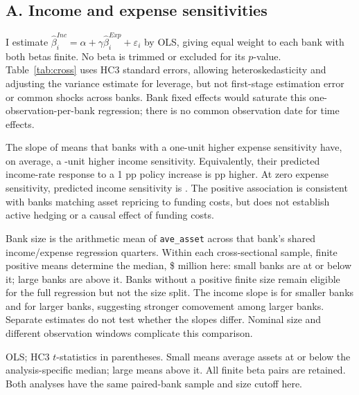 \documentclass[10pt]{article}
\begin{document}
\subsection*{A. Income and expense sensitivities}
I estimate $\widehat\beta_i^{Inc}=\alpha+\gamma\widehat\beta_i^{Exp}+\varepsilon_i$ by OLS, giving equal weight to each bank with both betas finite. No beta is trimmed or excluded for its $p$-value. Table~\ref{tab:cross} uses HC3 standard errors, allowing heteroskedasticity and adjusting the variance estimate for leverage, but not first-stage estimation error or common shocks across banks. Bank fixed effects would saturate this one-observation-per-bank regression; there is no common observation date for time effects.

The slope of \IncAllSlope{} means that banks with a one-unit higher expense sensitivity have, on average, a \IncAllSlope{}-unit higher income sensitivity. Equivalently, their predicted income-rate response to a 1 pp policy increase is \IncAllSlope{} pp higher. At zero expense sensitivity, predicted income sensitivity is \IncAllIntercept{}. The positive association is consistent with banks matching asset repricing to funding costs, but does not establish active hedging or a causal effect of funding costs.

Bank size is the arithmetic mean of \texttt{ave\_asset} across that bank's shared income/expense regression quarters. Within each cross-sectional sample, finite positive means determine the median, \$\SizeCutoff{} million here: small banks are at or below it; large banks are above it. Banks without a positive finite size remain eligible for the full regression but not the size split. The income slope is \IncSmallSlope{} for smaller banks and \IncLargeSlope{} for larger banks, suggesting stronger comovement among larger banks. Separate estimates do not test whether the slopes differ. Nominal size and different observation windows complicate this comparison.

\begin{table}[H]
\centering
\caption{Cross-sectional relationships between bank sensitivities}\label{tab:cross}

\begin{minipage}{0.97\textwidth}\footnotesize
OLS; HC3 $t$-statistics in parentheses. Small means average assets at or below the analysis-specific median; large means above it. All finite beta pairs are retained. Both analyses have the same paired-bank sample and size cutoff here.
\end{minipage}
\end{table}
\end{document}
